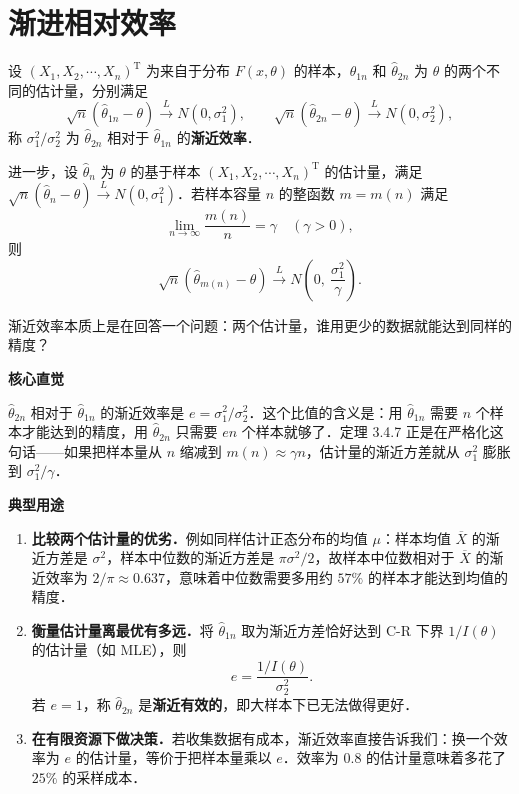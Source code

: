 \section{渐进相对效率}
\begin{note}
    设 $(X_1, X_2, \cdots, X_n)^\mathrm{T}$ 为来自于分布 $F(x,\theta)$ 的样本，$\hat{\theta}_{1n}$ 和 $\hat{\theta}_{2n}$ 为 $\theta$ 的两个不同的估计量，分别满足
\[
\sqrt{n}(\hat{\theta}_{1n} - \theta) \xrightarrow{L} N(0, \sigma_1^2), \qquad \sqrt{n}(\hat{\theta}_{2n} - \theta) \xrightarrow{L} N(0, \sigma_2^2),
\]
称 $\sigma_1^2/\sigma_2^2$ 为 $\hat{\theta}_{2n}$ 相对于 $\hat{\theta}_{1n}$ 的\textbf{渐近效率}．
\end{note}
\begin{theorem}[渐近效率]


进一步，设 $\hat{\theta}_n$ 为 $\theta$ 的基于样本 $(X_1, X_2, \cdots, X_n)^\mathrm{T}$ 的估计量，满足 $\sqrt{n}(\hat{\theta}_n - \theta) \xrightarrow{L} N(0, \sigma_1^2)$．若样本容量 $n$ 的整函数 $m = m(n)$ 满足
\[
\lim_{n \to \infty} \frac{m(n)}{n} = \gamma \quad (\gamma > 0),
\]
则
\[
\sqrt{n}\!\left(\hat{\theta}_{m(n)} - \theta\right) \xrightarrow{L} N\!\left(0,\ \frac{\sigma_1^2}{\gamma}\right).
\]
\end{theorem}
\begin{dxtips}
    渐近效率本质上是在回答一个问题：两个估计量，谁用更少的数据就能达到同样的精度？
  
    \textbf{核心直觉}

$\hat{\theta}_{2n}$ 相对于 $\hat{\theta}_{1n}$ 的渐近效率是 $e = \sigma_1^2/\sigma_2^2$．这个比值的含义是：用 $\hat{\theta}_{1n}$ 需要 $n$ 个样本才能达到的精度，用 $\hat{\theta}_{2n}$ 只需要 $en$ 个样本就够了．定理 3.4.7 正是在严格化这句话——如果把样本量从 $n$ 缩减到 $m(n) \approx \gamma n$，估计量的渐近方差就从 $\sigma_1^2$ 膨胀到 $\sigma_1^2/\gamma$．

\end{dxtips}
\textbf{典型用途}

\begin{enumerate}
    \item \textbf{比较两个估计量的优劣．}例如同样估计正态分布的均值 $\mu$：样本均值 $\overline{X}$ 的渐近方差是 $\sigma^2$，样本中位数的渐近方差是 $\pi\sigma^2/2$，故样本中位数相对于 $\overline{X}$ 的渐近效率为 $2/\pi \approx 0.637$，意味着中位数需要多用约 $57\%$ 的样本才能达到均值的精度．

    \item \textbf{衡量估计量离最优有多远．}将 $\hat{\theta}_{1n}$ 取为渐近方差恰好达到 C-R 下界 $1/I(\theta)$ 的估计量（如 MLE），则
    \[
        e = \frac{1/I(\theta)}{\sigma_2^2}.
    \]
    若 $e = 1$，称 $\hat{\theta}_{2n}$ 是\textbf{渐近有效的}，即大样本下已无法做得更好．

    \item \textbf{在有限资源下做决策．}若收集数据有成本，渐近效率直接告诉我们：换一个效率为 $e$ 的估计量，等价于把样本量乘以 $e$．效率为 $0.8$ 的估计量意味着多花了 $25\%$ 的采样成本．
\end{enumerate}

